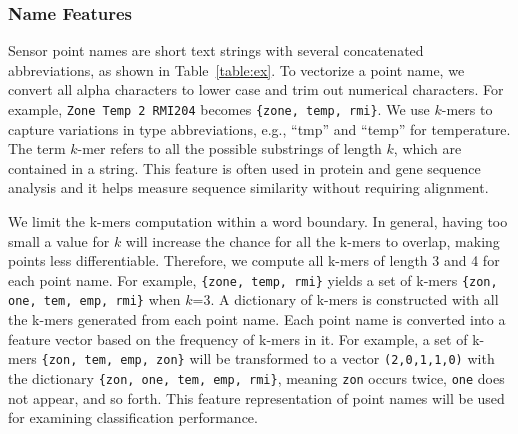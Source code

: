 
\subsubsection{Name Features}
Sensor point names are short text strings with several concatenated abbreviations, as shown in Table~\ref{table:ex}. 
To vectorize a point name, we convert all alpha characters to lower case and trim out numerical characters. 
For example, \texttt{Zone Temp 2 RMI204} becomes \texttt{\{zone, temp, rmi\}}. 
We use $k$-mers \cite{leslie2004mismatch} to capture variations in type abbreviations, e.g., ``tmp'' and ``temp'' for temperature.
The term $k$-mer refers to all the possible substrings of length $k$, which are contained in a string. This feature is often used in protein and gene sequence analysis and 
it helps measure sequence similarity without requiring alignment. 

We limit the k-mers computation within a word boundary.
In general, having too small a value for $k$ will increase the chance for all the k-mers to overlap, making points less differentiable.
Therefore, we compute all k-mers of length 3 and 4 for each point name.
For example, \texttt{\{zone, temp, rmi\}} yields a set of k-mers \texttt{\{zon, one, tem, emp, rmi\}} when $k$=3.
A dictionary of k-mers is constructed with all the k-mers generated from each point name. 
Each point name is converted into a feature vector based on the frequency of k-mers in it. 
For example, a set of k-mers \texttt{\{zon, tem, emp, zon\}} will be transformed to a vector
\texttt{(2,0,1,1,0)} with the dictionary \texttt{\{zon, one, tem, emp, rmi\}}, meaning \texttt{zon} occurs twice, \texttt{one} does 
not appear, and so forth. 
This feature representation of point names will be used for examining classification performance.


